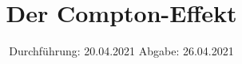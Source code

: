 

\subject{V603}
\title{Der Compton-Effekt}
\date{%
  Durchführung: 20.04.2021
  \hspace{3em}
  Abgabe: 26.04.2021
}



\maketitle
\thispagestyle{empty}
\tableofcontents
\newpage







\printbibliography{}


